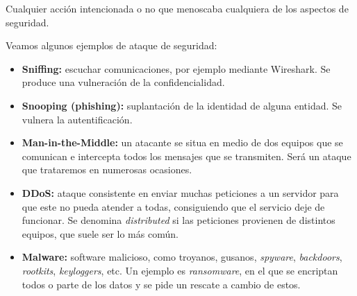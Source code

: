 \begin{definicion}
    Cualquier acción intencionada o no que menoscaba cualquiera de los aspectos de seguridad. 
\end{definicion}

Veamos algunos ejemplos de ataque de seguridad:
\begin{itemize}
    \item \textbf{Sniffing:} escuchar comunicaciones, por ejemplo mediante Wireshark. Se produce una vulneración de la confidencialidad.
    \item \textbf{Snooping (phishing):} suplantación de la identidad de alguna entidad. Se vulnera la autentificación.
    \item \textbf{Man-in-the-Middle:} un atacante se situa en medio de dos equipos que se comunican e intercepta todos los mensajes que se transmiten. Será un ataque que trataremos en numerosas ocasiones.
    \item \textbf{\acrfull{DDoS}:} ataque consistente en enviar muchas peticiones a un servidor para que este no pueda atender a todas, consiguiendo que el servicio deje de funcionar. Se denomina \emph{distributed} si las peticiones provienen de distintos equipos, que suele ser lo más común. 
    \item \textbf{Malware:} software malicioso, como troyanos, gusanos, \textit{spyware}, \textit{backdoors}, \textit{rootkits}, \textit{keyloggers}, etc. Un ejemplo es \textit{ransomware}, en el que se encriptan todos o parte de los datos y se pide un rescate a cambio de estos.
\end{itemize}


